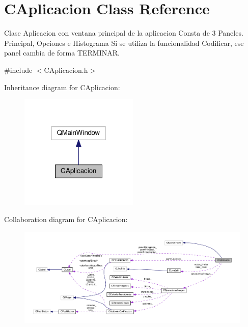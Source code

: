 \hypertarget{classCAplicacion}{}\section{C\+Aplicacion Class Reference}
\label{classCAplicacion}


Clase Aplicacion con ventana principal de la aplicacion Consta de 3 Paneles. Principal, Opciones e Histograma Si se utiliza la funcionalidad Codificar, ese panel cambia de forma T\+E\+R\+M\+I\+N\+AR.  




{\ttfamily \#include $<$C\+Aplicacion.\+h$>$}



Inheritance diagram for C\+Aplicacion\+:
\nopagebreak
\begin{figure}[H]
\begin{center}
\leavevmode
\includegraphics[width=160pt]{classCAplicacion__inherit__graph}
\end{center}
\end{figure}


Collaboration diagram for C\+Aplicacion\+:
\nopagebreak
\begin{figure}[H]
\begin{center}
\leavevmode
\includegraphics[width=350pt]{classCAplicacion__coll__graph}
\end{center}
\end{figure}
